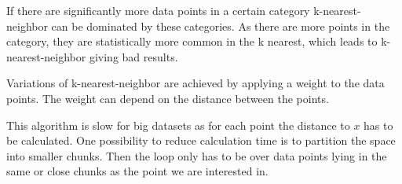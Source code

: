 If there are significantly more data points in a certain category k-nearest-neighbor can be dominated by these categories. As there are more points in the category, they are statistically more common in the k nearest, which leads to k-nearest-neighbor giving bad results.

Variations of k-nearest-neighbor are achieved by applying a weight to the data points. The weight can depend on the distance between the points.

This algorithm is slow for big datasets as for each point the distance to $x$ has to be calculated. One possibility to reduce calculation time is to partition the space into smaller chunks. Then the loop only has to be over data points lying in the same or close chunks as the point we are interested in.
